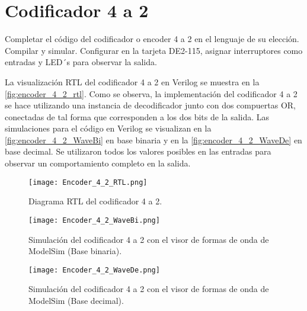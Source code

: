 \section{Codificador 4 a 2 \label{sec:s4}}

\begin{center}
	\begin{minipage}{12cm}
		\begin{tcolorbox}[title=Actividad 4]
			Completar el código del codificador o encoder 4 a 2 en el lenguaje de su elección. Compilar y simular. Configurar en la tarjeta DE2-115, asignar interruptores como entradas y LED´s para observar la salida.
		\end{tcolorbox}	
	\end{minipage}
\end{center}

La visualización RTL del codificador 4 a 2 en Verilog se muestra en la \autoref{fig:encoder_4_2_rtl}. Como se observa, la implementación del codificador 4 a 2 se hace utilizando una instancia de decodificador junto con dos compuertas OR, conectadas de tal forma que corresponden a los dos bits de la salida. Las simulaciones para el código en Verilog se visualizan en la \autoref{fig:encoder_4_2_WaveBi} en base binaria y en la \autoref{fig:encoder_4_2_WaveDe} en base decimal. Se utilizaron todos los valores posibles en las entradas para observar un comportamiento completo en la salida.

\begin{figure}[ht]
	\centering
	\texttt{[image: Encoder\_4\_2\_RTL.png]}
	\caption{Diagrama RTL del codificador 4 a 2. \label{fig:encoder_4_2_rtl}}
\end{figure}

\begin{figure}[ht]
	\centering
	\texttt{[image: Encoder\_4\_2\_WaveBi.png]}
	\caption{Simulación del codificador 4 a 2 con el visor de formas de onda de ModelSim (Base binaria). \label{fig:encoder_4_2_WaveBi}}
\end{figure}

\begin{figure}[ht]
	\centering
	\texttt{[image: Encoder\_4\_2\_WaveDe.png]}
	\caption{Simulación del codificador 4 a 2 con el visor de formas de onda de ModelSim (Base decimal). \label{fig:encoder_4_2_WaveDe}}
\end{figure}